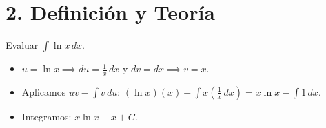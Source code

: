 \documentclass[11pt]{article}
\newenvironment{teoria}{\section*{2. Definición y Teoría}}{}
\newenvironment{ejemplo}[1]{\begin{tcolorbox}[colback=gray!5,colframe=gray!60!black,title=Ejemplo Analítico: #1]}{\end{tcolorbox}}
\begin{document}
\begin{teoria}
  \begin{ejemplo}{El Diferencial "Oculto" (Por Partes)}
    Evaluar $\displaystyle\int \ln x \, dx$.
    \begin{itemize}
      \item $\displaystyle u = \ln x \implies du = \frac{1}{x} \, dx$ \quad y \quad $\displaystyle dv = dx \implies v = x$.
      \item Aplicamos $uv - \displaystyle\int v \, du$: $\displaystyle (\ln x)(x) - \displaystyle\int x \left( \frac{1}{x} \, dx \right) = x \ln x - \displaystyle\int 1 \, dx$.
      \item Integramos: $\displaystyle x \ln x - x + C$.
    \end{itemize}
  \end{ejemplo}

\end{teoria}
\end{document}
